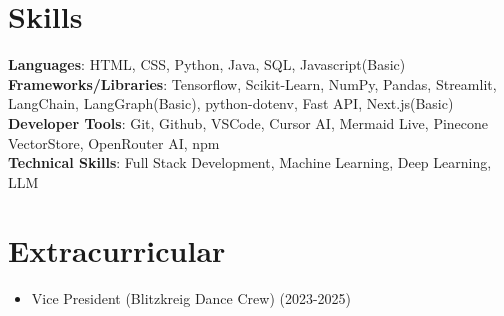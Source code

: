 \documentclass[letterpaper,10pt]{article}
\begin{document}
\section{Skills}
 \begin{itemize}[leftmargin=0.15in, label={}]
    \small{\item{
     \textbf{Languages}{: HTML, CSS, Python, Java, SQL, Javascript(Basic)} \\ \vspace*{0.05cm}
     \textbf{Frameworks/Libraries}{: Tensorflow, Scikit-Learn, NumPy, Pandas, Streamlit, LangChain, LangGraph(Basic), python-dotenv, Fast API, Next.js(Basic)} \\ \vspace*{0.05cm}
     \textbf{Developer Tools}{: Git, Github, VSCode, Cursor AI, Mermaid Live, Pinecone VectorStore, OpenRouter AI, npm} \\ \vspace*{0.05cm}
     \textbf{Technical Skills}{: Full Stack Development, Machine Learning, Deep Learning, LLM}
    }}
 \end{itemize}

\vspace*{0.05cm}
\section{Extracurricular}
\begin{itemize}[leftmargin=0.15in, label={}]
  \item{Vice President (Blitzkreig Dance Crew) \hfill (2023-2025)}
\end{itemize}
\vspace*{0.05cm}
\end{document}
